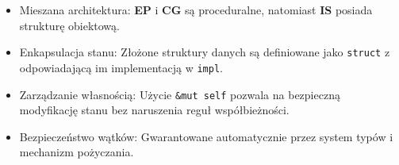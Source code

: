 \begin{itemize}
    \item Mieszana architektura: \textbf{EP} i \textbf{CG} są proceduralne, natomiast \textbf{IS} posiada strukturę obiektową.
    \item Enkapsulacja stanu: Złożone struktury danych są definiowane jako \texttt{struct} z odpowiadającą im implementacją w \texttt{impl}.
    \item Zarządzanie własnością: Użycie \texttt{\&mut self} pozwala na bezpieczną modyfikację stanu bez naruszenia reguł współbieżności.
    \item Bezpieczeństwo wątków: Gwarantowane automatycznie przez system typów i mechanizm pożyczania.
\end{itemize}

  